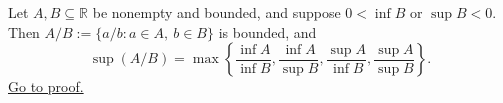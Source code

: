 \begin{theorem}
\label{thm:supremum-quotient-set}
Let $A,B\subseteq\mathbb{R}$ be nonempty and bounded, and suppose
$0<\inf B$ or $\sup B<0$.  Then
$A/B:=\{a/b:a\in A,\ b\in B\}$ is bounded, and
\[
  \sup(A/B)=
  \max\left\{\frac{\inf A}{\inf B},\frac{\inf A}{\sup B},
              \frac{\sup A}{\inf B},\frac{\sup A}{\sup B}\right\}.
\]
\hyperref[prf:supremum-quotient-set]{Go to proof.}
\end{theorem}